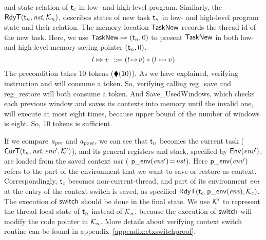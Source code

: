 and state relation of $\textsf{t}_c$ in low- and high-level 
program. Similarly, the $\textsf{RdyT}({\textsf{t}_n}, {\textit{nst}}, {\mathcal{K}_n})$, 
describes states of new task $\textsf{t}_n$ in low- and high-level 
program state and their relation. The memory location 
$\mathsf{TaskNew}$ records the thread id of the new task.  
Here, we use ${\mathsf{TaskNew}}\Mapsto{(\textsf{t}_n, 0)}$ to present 
$\mathsf{TaskNew}$ in both low- and high-level memory saving 
pointer $(\textsf{t}_n, 0)$. 
\[
    \relmsto{\loc}{\val} \ \define \ 
    (\msto{\loc}{\val}) \sepstar (\hmsto{\loc}{\val})
\]
The precondition takes 10 tokens ($\blacklozenge({10})$). 
As we have explained, verifying instruction \call{} 
and \jmp{} will consume a token. So, verifying calling 
\textsf{reg\_save} and \textsf{reg\_restore} will 
both consume a token. And \textsf{Save\_UsedWindows}, 
which checks each previous window 
and saves its contexts into memory until the invalid one, 
will execute at most eight times, because upper bound of 
the number of windows is eight. So, 10 tokens is sufficient. 

If we compare $\textit{a}_\textit{pre}$ and $\textit{a}_\textit{post}$, we can see that
$\textsf{t}_n$ becomes the current task
($\textsf{CurT}({\textsf{t}_n}, {\textit{nst}}, {\textit{env}'}, {\mathcal{K}'})$),
and its general registers and stack, specified by
$\mathsf{Env}({\textit{env}'})$, are loaded from the saved context
$\textit{nst}$ (\ie{} $\mathsf{p\_env}({\textit{env}'})\!=\!\textit{nst}$).
Here $\mathsf{p\_env}({\textit{env}'})$ refers to the part of the environment
that we want to save or restore as context.
Correspondingly, $\textsf{t}_c$ becomes non-current-thread,
and part of its environment $\textit{env}$ at the entry of
the context switch is saved, as specified
$\textsf{RdyT}({\textsf{t}_c}, {\mathsf{p\_env}({\textit{env}})}, {\mathcal{K}_c})$. 
The execution of $\mathsf{switch}$ should be done in the final state. 
We use $\mathcal{K}'$ to represent the thread local 
state of $\textsf{t}_n$ instead of $\mathcal{K}_n$, because 
the execution of $\mathsf{switch}$ will modify the code pointer 
in $\mathcal{K}_n$. More details about verifying 
context switch routine can be found in 
appendix~\ref{appendix:ctxswitchproof}. 